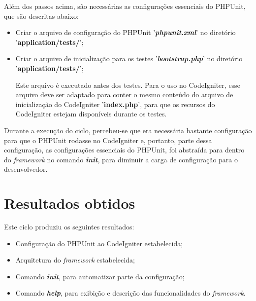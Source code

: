 	  Além dos passos acima, são necessárias as configurações essenciais do PHPUnit, que são descritas abaixo:
	  
	  \begin{itemize}
	    \item Criar o arquivo de configuração do PHPUnit '\textbf{\textit{phpunit.xml}}' 
		  no diretório '\textbf{application/tests/}';
	    
	    \item Criar o arquivo de inicialização para os testes '\textbf{\textit{bootstrap.php}}'
		  no diretório '\textbf{application/tests/}';
	      
		\subitem Este arquivo é executado antes dos testes. Para o uso no CodeIgniter, esse arquivo deve ser
			 adaptado para conter o mesmo conteúdo do arquivo de inicialização do CodeIgniter '\textbf{index.php}', 
			 para que os recursos do CodeIgniter estejam disponíveis durante os testes.
	  \end{itemize}
	  
	  Durante a execução do ciclo, percebeu-se que era necessária bastante configuração para que o PHPUnit rodasse no
	  CodeIgniter e, portanto, parte dessa configuração, as configurações essenciais do PHPUnit, foi abstraída para
	  dentro do \textit{framework} no comando \textit{\textbf{init}}, para diminuir a carga de configuração
	  para o desenvolvedor.
 
  \section{Resultados obtidos}
    
      Este ciclo produziu os seguintes resultados:
      
      \begin{itemize}

	\item Configuração do PHPUnit ao CodeIgniter estabelecida;
	
	\item Arquitetura do \textit{framework} estabelecida;
	
	\item Comando \textit{\textbf{init}}, para automatizar parte da configuração;
	
	\item Comando \textit{\textbf{help}}, para exibição e descrição das funcionalidades do \textit{framework}.

      \end{itemize}

